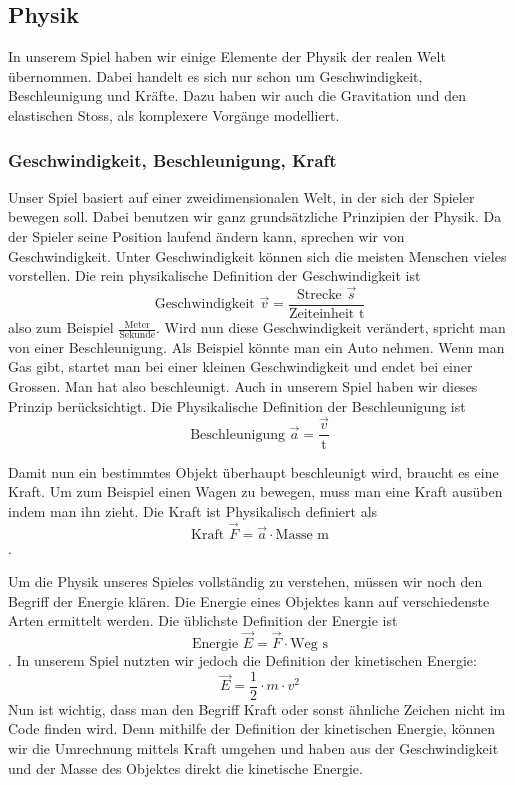 \documentclass[12pt,a4paper]{scrartcl}
\begin{document}
\subsection{Physik}
In unserem Spiel haben wir einige Elemente der Physik der realen Welt übernommen.
Dabei handelt es sich nur schon um Geschwindigkeit, Beschleunigung und Kräfte.
Dazu haben wir auch die Gravitation und den elastischen Stoss, als komplexere Vorgänge modelliert.
\subsubsection{Geschwindigkeit, Beschleunigung, Kraft}
Unser Spiel basiert auf einer zweidimensionalen Welt, in der sich der Spieler bewegen soll.
Dabei benutzen wir ganz grundsätzliche Prinzipien der Physik.
Da der Spieler seine Position laufend ändern kann, sprechen wir von Geschwindigkeit.
Unter Geschwindigkeit können sich die meisten Menschen vieles vorstellen.
Die rein physikalische Definition der Geschwindigkeit ist \[ \text{Geschwindigkeit }  \vec{v} = \frac{\text{Strecke } \vec{s}}{\text{Zeiteinheit t}}\] also zum Beispiel $\frac{\text{Meter}}{\text{Sekunde}}$.
Wird nun diese Geschwindigkeit verändert, spricht man von einer Beschleunigung.
Als Beispiel könnte man ein Auto nehmen.
Wenn man Gas gibt, startet man bei einer kleinen Geschwindigkeit und endet bei einer Grossen. Man hat also beschleunigt.
Auch in unserem Spiel haben wir dieses Prinzip berücksichtigt.
Die Physikalische Definition der Beschleunigung ist \[\text{Beschleunigung }\vec{a} = \frac{\vec{v}}{\text{t}}\]

Damit nun ein bestimmtes Objekt überhaupt beschleunigt wird, braucht es eine Kraft.
Um zum Beispiel einen Wagen zu bewegen, muss man eine Kraft ausüben indem man ihn zieht.
Die Kraft ist Physikalisch definiert als
\[\text{Kraft } \vec{F} = \vec{a} \cdot \text{Masse m}\].

Um die Physik unseres Spieles vollständig zu verstehen, müssen wir noch den Begriff der Energie klären.
Die Energie eines Objektes kann auf verschiedenste Arten ermittelt werden.
Die üblichste Definition der Energie ist
\[\text{Energie } \vec{E} = \vec{F} \cdot \text{Weg s}\].
In unserem Spiel nutzten wir jedoch die Definition der kinetischen Energie:
\[ \vec{E} = \frac{1}{2} \cdot m \cdot v^2\]
Nun ist wichtig, dass man den Begriff Kraft oder sonst ähnliche Zeichen nicht im Code finden wird.
Denn mithilfe der Definition der kinetischen Energie, können wir die Umrechnung mittels Kraft umgehen und haben aus der Geschwindigkeit und der Masse des Objektes direkt die kinetische Energie.
\end{document}
